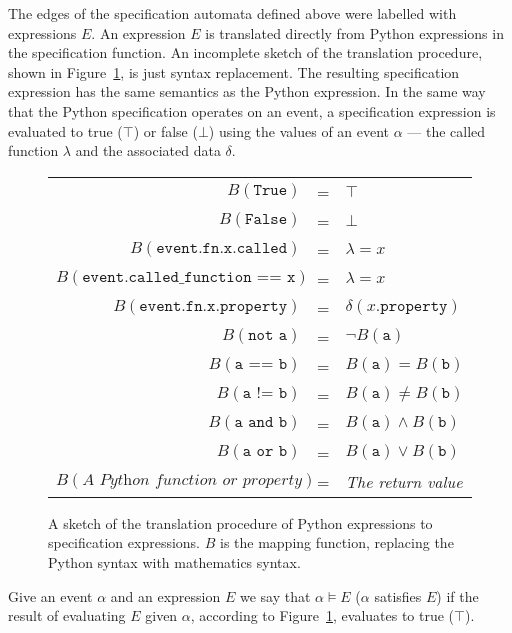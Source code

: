 The edges of the specification automata defined above were labelled with
expressions $E$. An expression $E$ is translated directly from Python
expressions in the specification function. An incomplete sketch of the
translation procedure, shown in Figure~\ref{figure-semantics-translation}, is
just syntax replacement. The resulting specification expression has the same
semantics as the Python expression. In the same way that the Python
specification operates on an event, a specification expression is evaluated to
true ($\top$) or false ($\bot$) using the values of an event $\alpha$ --- the
called function $\lambda$ and the associated data $\delta$.

\begin{figure}[h!]
	\begin{minipage}{0.9\textwidth}
		\centering
    \begin{tabular}{r c l}
      $B(\texttt{True})$ & = & $\top$ \\
      $B(\texttt{False})$ & = & $\bot$ \\
      $B(\texttt{event.fn.x.called})$ & = & $\lambda = x$ \\
      $B(\texttt{event.called\_function == x})$ & = & $\lambda = x$ \\
      $B(\texttt{event.fn.x.property})$ & = & $\delta(x.\texttt{property})$ \\
      $B(\texttt{not a})$ & = & $\neg B(\texttt{a})$ \\
      $B(\texttt{a == b})$ & = & $B(\texttt{a}) = B(\texttt{b})$ \\
      $B(\texttt{a != b})$ & = & $B(\texttt{a}) \neq B(\texttt{b})$ \\
      $B(\texttt{a and b})$ & = & $B(\texttt{a}) \wedge B(\texttt{b})$ \\
      $B(\texttt{a or b})$ & = & $B(\texttt{a}) \vee B(\texttt{b})$ \\
      $B(\textit{A Python function or property})$ & = & \textit{The return value} \\
    \end{tabular}
  \end{minipage}
  \caption{A sketch of the translation procedure of Python expressions to
    specification expressions. $B$ is the mapping function, replacing the
    Python syntax with mathematics syntax.}
  \label{figure-semantics-translation}
\end{figure}


Give an event $\alpha$ and an expression $E$ we say that $\alpha \models E$
($\alpha$ satisfies $E$) if the result of evaluating $E$ given $\alpha$,
according to Figure~\ref{figure-semantics-translation}, evaluates to true
($\top$).


